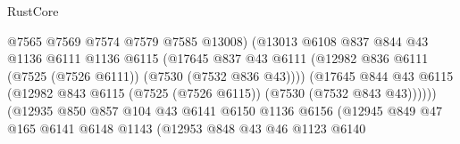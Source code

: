 \begin{lexlean}{RustCore}
\begin{coremodule}
                                        @7565
                                        @7569
                                        @7574
                                        @7579
                                        @7585
                                        @13008)
                                      (@13013
                                        @6108
                                        @837
                                        @844
                                        @43
                                        @1136
                                        @6111
                                        @1136
                                        @6115
                                        (@17645
                                          @837
                                          @43
                                          @6111
                                          (@12982
                                            @836
                                            @6111
                                            (@7525 (@7526 @6111))
                                            (@7530 (@7532 @836 @43))))
                                        (@17645
                                          @844
                                          @43
                                          @6115
                                          (@12982
                                            @843
                                            @6115
                                            (@7525 (@7526 @6115))
                                            (@7530 (@7532 @843 @43))))))
                                    (@12935
                                      @850
                                      @857
                                      @104
                                      @43
                                      @6141
                                      @6150
                                      @1136
                                      @6156
                                      (@12945
                                        @849
                                        @47
                                        @165
                                        @6141
                                        @6148
                                        @1143
                                        (@12953
                                          @848
                                          @43
                                          @46
                                          @1123
                                          @6140

\end{coremodule}
\end{lexlean}

